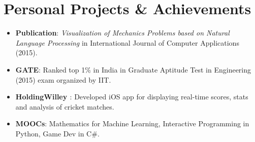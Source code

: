 \documentclass[letterpaper,11pt]{article}
\newcommand{\resumeItem}[2]{
	\item\normalsize{
		\textbf{#1}{: #2}
	}
}
\newcommand{\resumeSubItem}[2]{\resumeItem{#1}{#2}\vspace{-4pt}}
\newcommand{\resumeSubHeadingListStart}{\begin{itemize}[leftmargin=*]}
\newcommand{\resumeSubHeadingListEnd}{\end{itemize}}
\begin{document}
	\section{Personal Projects \& Achievements}
	\resumeSubHeadingListStart
	\resumeSubItem{Publication}{\textit{Visualization of Mechanics Problems based on Natural Language Processing} in International Journal of Computer Applications (2015).}
	\resumeSubItem{GATE}
	{Ranked top 1\% in India in Graduate Aptitude Test in Engineering (2015) exam organized by IIT.} %
	\resumeSubItem{HoldingWilley \href{https://apps.apple.com/app/id1229976116}{\faApple}}
	{Developed iOS app for displaying real-time scores, stats and analysis of cricket matches.}
	\resumeSubItem{MOOCs}
	{Mathematics for Machine Learning, Interactive Programming in Python, Game Dev in C\#.}
	\resumeSubHeadingListEnd
	
\end{document}
